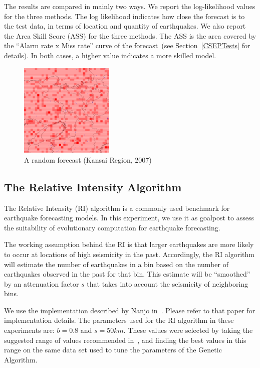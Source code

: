 \documentclass[a4paper,twoside]{article}
\begin{document}
The results are compared in mainly two ways. We report the
log-likelihood values for the three methods. The log likelihood
indicates how close the forecast is to the test data, in terms of
location and quantity of earthquakes. We also report the Area Skill
Score (ASS) for the three methods. The ASS is the area covered by the
``Alarm rate x Miss rate'' curve of the forecast~(see
Section~\ref{CSEPTests} for details). In both cases, a higher value
indicates a more skilled model.


\begin{figure}
  \begin{center}
    \includegraphics[width=0.4\textwidth]{img/kansai07_random.png}
  \end{center}
  \caption{A random forecast (Kansai Region, 2007)}
  \label{randomforecast}
\end{figure}

\subsection{The Relative Intensity Algorithm}\label{RI}

The Relative Intensity (RI) algorithm is a commonly used benchmark for
earthquake forecasting models. In this experiment, we use it as
goalpost to assess the suitability of evolutionary computation for
earthquake forecasting.

The working assumption behind the RI is that larger earthquakes are
more likely to occur at locations of high seismicity in the
past. Accordingly, the RI algorithm will estimate the number of
earthquakes in a bin based on the number of earthquakes observed in
the past for that bin. This estimate will be ``smoothed'' by an
attenuation factor $s$ that takes into account the seismicity of
neighboring bins.

We use the implementation described by Nanjo
in~\cite{Nanjo2011}. Please refer to that paper for implementation
details. The parameters used for the RI algorithm in these experiments
are: $b = 0.8$ and $s = 50km$. These values were selected by taking
the suggested range of values recommended in~\cite{Nanjo2011}, and
finding the best values in this range on the same data set used to
tune the parameters of the Genetic Algorithm.
\end{document}
